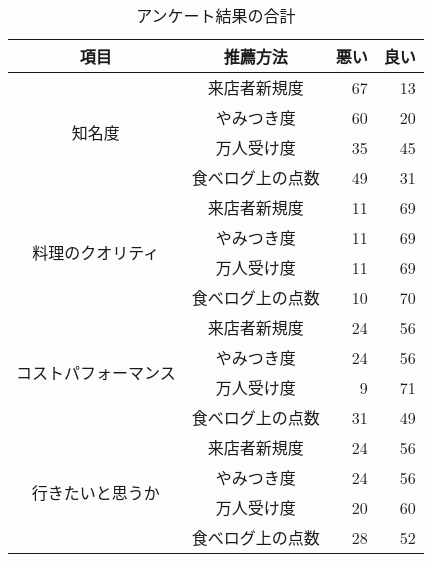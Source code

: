 \begin{table}[H]
\centering
\caption{アンケート結果の合計}
\label{table:questionnaire:sum}
\small
\begin{tabular}{|c|c|r|r|}
\hline
項目 & 推薦方法 & 悪い\footnotemark[3] & 良い\footnotemark[4] \\ \hline
\multirow{4}{*}{知名度} & 来店者新規度 & 67 & 13 \\ \cline{2-4}
 & やみつき度 & 60 & 20 \\ \cline{2-4}
 & 万人受け度 & 35 & 45 \\ \cline{2-4}
 & 食べログ上の点数 & 49 & 31 \\ \hline
\multirow{4}{*}{料理のクオリティ} & 来店者新規度 & 11 & 69 \\ \cline{2-4}
 & やみつき度 & 11 & 69 \\ \cline{2-4}
 & 万人受け度 & 11 & 69 \\ \cline{2-4}
 & 食べログ上の点数 & 10 & 70 \\ \hline
\multirow{4}{*}{コストパフォーマンス} & 来店者新規度 & 24 & 56 \\ \cline{2-4}
 & やみつき度 & 24 & 56 \\ \cline{2-4}
 & 万人受け度 & 9 & 71 \\ \cline{2-4}
 & 食べログ上の点数 & 31 & 49 \\ \hline
\multirow{4}{*}{行きたいと思うか} & 来店者新規度 & 24 & 56 \\ \cline{2-4}
 & やみつき度 & 24 & 56 \\ \cline{2-4}
 & 万人受け度 & 20 & 60 \\ \cline{2-4}
 & 食べログ上の点数 & 28 & 52 \\ \hline
\end{tabular}
\end{table}
